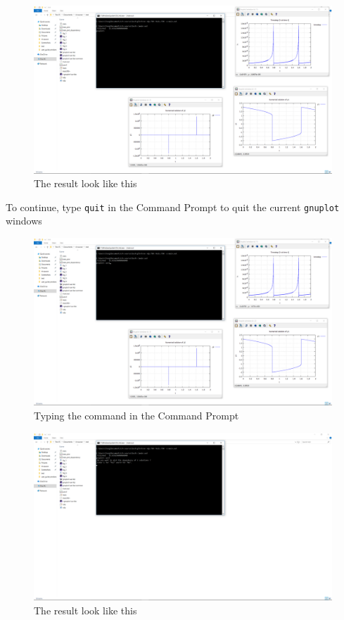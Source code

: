 \documentclass{article}
\begin{document}
	\begin{figure}[H]
		\centering	\includegraphics[width=15cm]{fig8}
		\caption{The result look like this}
	\end{figure}
	\noindent To continue, type \texttt{quit} in the Command Prompt to quit the current \texttt{gnuplot} windows
	\begin{figure}[H]
		\centering	\includegraphics[width=15cm]{fig81}
		\caption{Typing the command in the Command Prompt}
	\end{figure}
	\begin{figure}[H]
		\centering	\includegraphics[width=15cm]{fig82}
		\caption{The result look like this}
	\end{figure}
\end{document}
